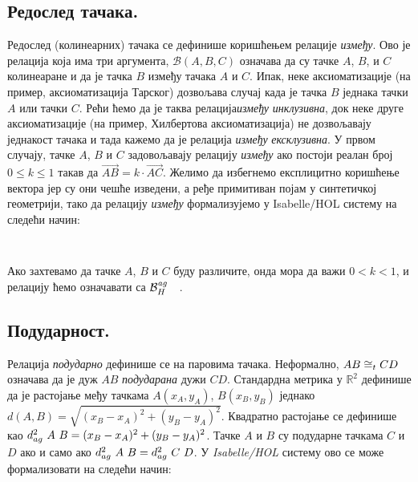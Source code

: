 \subsection{Редослед тачака.} Редослед (колинеарних) тачака се
дефинише коришћењем релације \emph{између}. Ово је релација која има
три аргумента, $\mathcal{B}(A, B, C)$ означава да су тачке $A$, $B$, и
$C$ колинеаране и да је тачка $B$ између тачака $A$ и $C$. Ипак, неке
аксиоматизације (на пример, аксиоматизација Тарског) дозвољава случај
када је тачка $B$ једнака тачки $A$ или тачки $C$. Рећи ћемо да је
таква релација\emph{између} {\em инклузивна}, док неке друге
аксиоматизације (на пример, Хилбертова аксиоматизација) не дозвољавају
једнакост тачака и тада кажемо да је релација \emph{између} {\em
  ексклузивна}. У првом случају, тачке $A$, $B$ и $C$ задовољавају
релацију \emph{између} ако постоји реалан број $0 \le k \le 1$ такав
да $\overrightarrow{AB} = k \cdot \overrightarrow{AC}$. Желимо да
избегнемо експлицитно коришћење вектора јер су они чешће изведени, а
ређе примитиван појам у синтетичкој геометрији, тако да релацију
\emph{између} формализујемо у Isabelle/HOL систему на следећи начин:

{\tt 
\begin{tabbing}
\hspace{5mm}\=\hspace{5mm}\=\kill
\textbf{definition} "$\agbett{(xa, ya)}{(xb, yb)}{(xc, yc)} \longleftrightarrow$}\\
\>$(\exists (k::real).\ 0 \le k \ \wedge\ k \le 1 \ \wedge$\\
\>\>$(xb - xa) = k \cdot (xc - xa) \ \wedge\ (yb - ya) = k \cdot (yc - ya))$"}
\end{tabbing}
}

\noindent Ако захтевамо да тачке $A$, $B$ и $C$ буду различите, онда
мора да важи $0 < k < 1$, и релацију ћемо означавати са
$\mathcal{B}_H^{\mathit{ag}}\ \ \ $.

\subsection{Подударност.} Релација \emph{подударно} дефинише се на паровима
тачака. Неформално, $AB \cong_t CD$ означава да је дуж $AB$
\emph{подударана} дужи $CD$. Стандардна метрика у $\mathbb{R}^2$
дефинише да је растојање међу тачкама $A(x_A, y_A)$, $B(x_B, y_B)$
једнако $d(A, B) = \sqrt{(x_B-x_A)^2+(y_B-y_A)^2}$. Квадратно
растојање се дефинише као $d^2_{ag}\ A\ B =
(x_B-x_A)^2+(y_B-y_A)^2$. Тачке $A$ и $B$ су подударне тачкама $C$ и
$D$ ако и само ако $d^2_{ag}\ A\ B = d^2_{ag}\ C\ D$. У
\emph{Isabelle/HOL} систему ово се може формализовати на следећи
начин:


